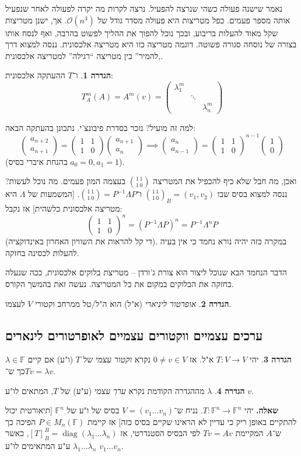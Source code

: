 \documentclass[a4paper]{article}
\DeclareMathOperator{\diag}    {diag}
\newcommand\F         {\mathbb{F}}
\newcommand\co        {\colon}
\newcommand\pms[1]    {\begin{pmatrix}
		#1
\end{pmatrix}}
\renewcommand\lg      {\lambda}
\newcommand\op    {^{-1}}
\newcommand\cl [1]    {\left ( #1 \right )}
\theoremstyle{definition}
\newtheorem{Definition}{\color{mygreen}הגדרה}
\newcommand\defi  [1] {\begin{Definition}#1\end{Definition}}
\begin{document}
	נאמר שישנה פעולה כשהי שנרצה להפעיל. נרצה לקרות מה יקרה לפעולה לאחר שנפעיל אותה מספר פעמים. כפל מטריצות היא פעולה מסדר גודל של $\mathcal{O}(n^3)$. אך, ישנן מטריצות שקל מאוד להעלות בריבוע, ובכך נוכל להפוך את ההליך לפשוט בהרבה, ואף לנסח אותו בצורה של נוסחה סגורה פשוטה. דוגמה מטריצה כזו היא מטריצה אלכסונית. ננסה למצוא דרך ,להמיר'' בין מטריצה ``רגילה'' למטריצה אלכסונית. 
	
	\defi{ו־$T$ ההעתקה אלכסונית: 
		\[ T_A^m(A) = A^m(v) = \pms{\lg_1^m && \\ & \ddots & \\ &&\lg_n^m} \]}
	למה זה מועיל? נזכר בסדרת פיבונצ'י. נתבונן בהעתקה הבאה: 
	\[ \pms{a_{n + 2} \\ a_{n + 1}} = \pms{1 & 1 \\ 1 & 0}\pms{a_{n + 1} \\ a_n} \implies \pms{a_n \\ a_{n - 1}} = \pms{1 & 1 \\ 1 & 0}^{n - 1}\pms{1 \\ 0} \]
	(בהנחת איברי בסיס $a_0 = 0, a_1 = 1$). 
	
	ואכן, מה חבל שלא כיף להכפיל את המטריצה $\binom{1\,1}{1\,0}$ בעצמה המון פעמים. מה נוכל לעשות? ננסה למצוא בסיס שבו $\binom{1 \, 1}{1\, 0}_B = (v_1, v_2)$ ו־$\binom{1 \, 1}{1 \, 0} = P\op \Lambda P$. [המשמעות של $\Lambda$ היא מטריצה אלכסונית כלשהית] אז נקבל: 
	\[ \pms{1 & 1 \\ 1 & 0}^{n} = \cl{P\op \Lambda P}^{n} = P\op\Lambda^nP \]
	(די קל להראות את השוויון האחרון באינדוקציה). במקרה כזה יהיה נורא נחמד כי אין בעיה להעלות לכסינה בחזקה. 
	
	הדבר הנחמד הבא שנוכל ליצור הוא צורת ג'ורדן – מטריצת בלוקים אלכסונית, ככה שנעלה בחזקה את הבלוקים במקום את כל המטריצה. נעשה זאת בהמשך הקורס. 
	
	\defi{\textit{אופרטור ליניארי} (א"ל) הוא ה"ל/טל ממרחב וקטורי $V$ לעצמו. }
	
	
	\subsection{ערכים עצמיים ווקטורים עצמיים לאופרטורים לינארים}
	\defi{יהי $T \co V \to V$ א"ל. אז $0 \neq v \in V$ נקרא \textit{וקטור עצמי} של $T$ (ו"ע) אם קיים $\lg \in \F$ כך ש־$T v =\lg v$. }
	
	\defi{$\lg$ מההגדרה הקודמת נקרא \textit{ערך עצמי} (ע"ע) של $T$, המתאים לו"ע $v$. }
	
	\textbf{שאלה. }יהי $T \co \F^n \to \F^n$. נניח ש־$V = (v_1 \dots v_n)$ בסיס של ו"ע של $\F^n$ [תיאורטית יכול להתקיים באופן ריק כי עדיין לא הראינו שקיים בסיס כזה] אז קיימת $P \in M_n(\F)$ הפיכה כך ש־$A$ המקיימת $Tv = Av$ לפי הבסיס הסטנדרטי, אז $[T]^B_B = \diag(\lg_1 \dots \lg_n)$, כאשר $\lg_1 \dots \lg_n$ ע"ע המתאימים לו"ע $v_1 \dots v_n$. 
	
\end{document}
